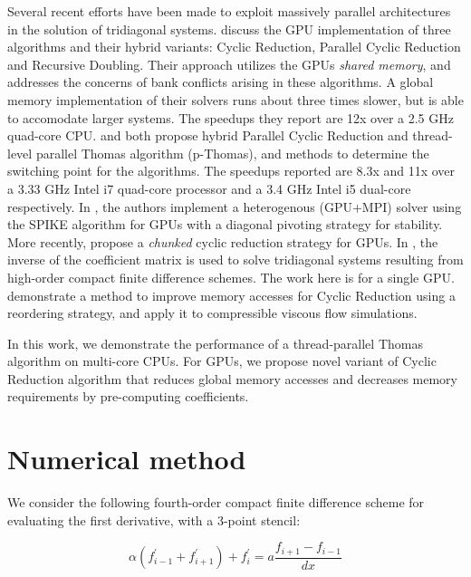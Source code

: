 \documentclass{article}
\begin{document}
    Several recent efforts have been made to exploit massively parallel architectures
    in the solution of tridiagonal systems.
    \cite{Zhang:2010:FTS:1837853.1693472} discuss the GPU implementation of three algorithms
    and their hybrid variants: Cyclic Reduction, Parallel Cyclic Reduction
    and Recursive Doubling.
    Their approach utilizes the GPUs \emph{shared memory},
    and addresses the concerns of bank conflicts arising in these algorithms.
    A global memory implementation of their solvers
    runs about three times slower, but is able to accomodate larger systems.
    The speedups they report are 12x over a 2.5 GHz quad-core CPU.
    \cite{kim2011scalable} and \cite{davidson2011auto} both propose hybrid
    Parallel Cyclic Reduction and thread-level parallel Thomas algorithm (p-Thomas), and
    methods to determine the switching point for the algorithms.
    The speedups reported are 8.3x and 11x over a 3.33 GHz Intel i7 quad-core
    processor and a 3.4 GHz Intel i5 dual-core respectively.
    In \cite{chang2012scalable},
    the authors implement a heterogenous (GPU+MPI) solver using the
    SPIKE algorithm for GPUs with a diagonal pivoting strategy for stability.
    More recently, \cite{zhao2015efficiently} propose a \emph{chunked} cyclic reduction
    strategy for GPUs.
    In \cite{tutkun2012gpu}, the inverse of the coefficient matrix
    is used to solve tridiagonal systems resulting from high-order compact
    finite difference schemes. The work here is for a single GPU.
    \cite{esfahanian2014efficient} demonstrate
    a method to improve memory accesses for Cyclic Reduction
    using a reordering strategy, and apply it to compressible viscous flow
    simulations.

    In this work,
    we demonstrate the performance of a thread-parallel Thomas algorithm
    on multi-core CPUs.
    For GPUs,
    we propose novel variant of Cyclic Reduction algorithm that
    reduces global memory accesses and decreases memory requirements by
    pre-computing coefficients.

\section{Numerical method}

    We consider the following fourth-order
    compact finite difference scheme for evaluating the first derivative,
    with a 3-point stencil:

    \begin{equation}
        \alpha(f^{\prime}_{i-1} + f^{\prime}_{i+1}) + f^{\prime}_i
        =
        a\frac{f_{i+1} - f_{i-1}}{dx}
    \end{equation}
\end{document}
